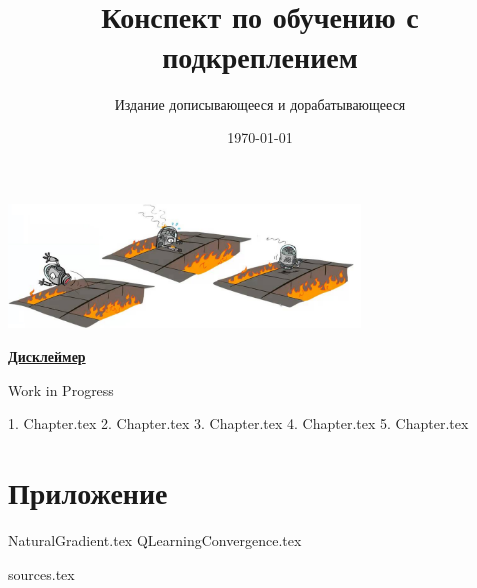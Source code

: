 \documentclass[a4paper, 10pt, oneside]{memoir}
\title{
\vspace{4cm}
\normalfont \normalsize 
\horrule{0.5pt} \\[0.4cm]
\huge Конспект по обучению с подкреплением
\horrule{2pt} \\[0.5cm]
}
\author{Издание дописывающееся и дорабатывающееся}
\date{\normalsize\today}
\begin{document}

\maketitle
\thispagestyle{empty}

\begin{center}
    \includegraphics[width=0.7\textwidth]{Images/robot.png}
\end{center}

\vspace{2cm}
\begin{center}
\textcolor{ChadBlue}{\underline{\textbf{Дисклеймер}}}

\vspace{1cm}
Work in Progress
\end{center}


\newpage
\tableofcontents*

{1. Chapter.tex}
{2. Chapter.tex}
{3. Chapter.tex}
{4. Chapter.tex}
{5. Chapter.tex}


\newpage

\appendix

\chapter{Приложение}

{NaturalGradient.tex}
{QLearningConvergence.tex}

{sources.tex}

\end{document}
